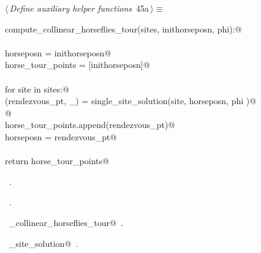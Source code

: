 \documentclass[11.5pt]{report}
\begin{document}

\begin{flushleft} \small
\begin{minipage}{\linewidth}\label{scrap66}\raggedright\small
{} $\langle\,${\itshape Define auxiliary helper functions}\nobreak\ {\footnotesize {45a}}$\,\rangle\equiv$
\vspace{-1ex}
\begin{list}{}{} \item
\mbox{}\verb@def compute_collinear_horseflies_tour(sites, inithorseposn, phi):@\\
\mbox{}\verb@@\\
\mbox{}\verb@      horseposn         = inithorseposn@\\
\mbox{}\verb@      horse_tour_points = [inithorseposn]@\\
\mbox{}\verb@@\\
\mbox{}\verb@      for site in sites:@\\
\mbox{}\verb@          (rendezvous_pt, _) = single_site_solution(site, horseposn, phi )@\\
\mbox{}\verb@            @\\
\mbox{}\verb@          horse_tour_points.append(rendezvous_pt)@\\
\mbox{}\verb@          horseposn = rendezvous_pt@\\
\mbox{}\verb@@\\
\mbox{}\verb@      return horse_tour_points@\\
\mbox{}\verb@@{\NWsep}
\end{list}
\vspace{-1.5ex}
\footnotesize
\begin{list}{}{\setlength{\itemsep}{-\parsep}\setlength{\itemindent}{-\leftmargin}}
\item \NWtxtMacroDefBy\ .
\item \NWtxtMacroRefIn\ .
\item \NWtxtIdentsDefed\nobreak\  \verb@compute_collinear_horseflies_tour@\nobreak\ .\item \NWtxtIdentsUsed\nobreak\  \verb@single_site_solution@\nobreak\ .
\item{}
\end{list}
\end{minipage}\vspace{4ex}
\end{flushleft}
\end{document}
